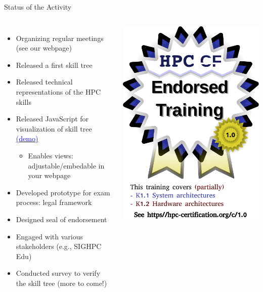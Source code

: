 \documentclass[compress,aspectratio=169]{beamer}
\newcommand{\hrefb}[2]{\href{#1}{\textcolor{blue}{#2}}}
\begin{document}
\begin{frame}{Status of the Activity}

\begin{columns}
	\begin{itemize}
	\item Organizing regular meetings (see our webpage)
	\item Released a first skill tree
	\item Released technical representations of the HPC skills
	\item Released JavaScript for visualization of skill tree \hrefb{https://www.hpc-certification.org/skills/}{(demo)}
		\begin{itemize}
			\item Enables views: adjustable/embedable in your webpage
		\end{itemize}
	\item Developed prototype for exam process: legal framework
	\item Designed seal of endorsement
	\item Engaged with various stakeholders (e.g., SIGHPC Edu)
	\item Conducted survey to verify the skill tree (more to come!)
\end{itemize}

\includegraphics[width=\textwidth]{certified.pdf}
\end{columns}


\end{frame}
\end{document}
